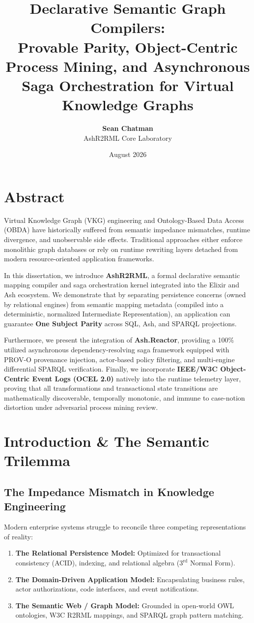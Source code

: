 \documentclass[12pt,a4paper,oneside]{book}
\title{\textbf{Declarative Semantic Graph Compilers: \\ Provable Parity, Object-Centric Process Mining, and Asynchronous Saga Orchestration for Virtual Knowledge Graphs}}
\author{\textbf{Sean Chatman} \\ AshR2RML Core Laboratory}
\date{August 2026}
\begin{document}
\maketitle

\chapter*{Abstract}
Virtual Knowledge Graph (VKG) engineering and Ontology-Based Data Access (OBDA) have historically suffered from semantic impedance mismatches, runtime divergence, and unobservable side effects. Traditional approaches either enforce monolithic graph databases or rely on runtime rewriting layers detached from modern resource-oriented application frameworks. 

In this dissertation, we introduce \textbf{AshR2RML}, a formal declarative semantic mapping compiler and saga orchestration kernel integrated into the Elixir and Ash ecosystem. We demonstrate that by separating persistence concerns (owned by relational engines) from semantic mapping metadata (compiled into a deterministic, normalized Intermediate Representation), an application can guarantee \textbf{One Subject Parity} across SQL, Ash, and SPARQL projections. 

Furthermore, we present the integration of \textbf{Ash.Reactor}, providing a 100\% utilized asynchronous dependency-resolving saga framework equipped with PROV-O provenance injection, actor-based policy filtering, and multi-engine differential SPARQL verification. Finally, we incorporate \textbf{IEEE/W3C Object-Centric Event Logs (OCEL 2.0)} natively into the runtime telemetry layer, proving that all transformations and transactional state transitions are mathematically discoverable, temporally monotonic, and immune to case-notion distortion under adversarial process mining review.

\tableofcontents

\chapter{Introduction \& The Semantic Trilemma}

\section{The Impedance Mismatch in Knowledge Engineering}
Modern enterprise systems struggle to reconcile three competing representations of reality:
\begin{enumerate}
    \item \textbf{The Relational Persistence Model:} Optimized for transactional consistency (ACID), indexing, and relational algebra ($3^{\text{rd}}$ Normal Form).
    \item \textbf{The Domain-Driven Application Model:} Encapsulating business rules, actor authorizations, code interfaces, and event notifications.
    \item \textbf{The Semantic Web / Graph Model:} Grounded in open-world OWL ontologies, W3C R2RML mappings, and SPARQL graph pattern matching.
\end{enumerate}
\end{document}
